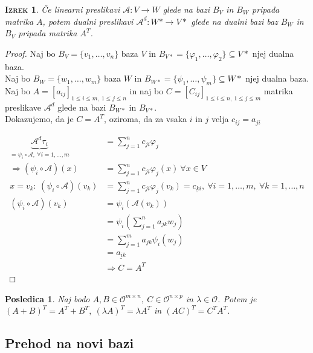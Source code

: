 \documentclass[a4paper,12pt]{article}
\newcommand{\A}{\mathcal{A}}
\newcommand{\OO}{\mathcal{O}}
\newtheorem*{izrek}{\textsc{Izrek}}
\newtheorem*{posl}{Posledica}
\begin{document}
\begin{izrek}
	Če linearni preslikavi $\A:V\to W$ glede na bazi $B_V$ in $B_W$ pripada matrika $A$, potem dualni preslikavi $\A^d:W*\to V*$ glede na dualni bazi baz $B_W$ in $B_V$ pripada matrika $A^T$. \\
\end{izrek}

\begin{proof}
	Naj bo $B_V=\{v_1,\ldots,v_n\}$ baza $V$ in $B_{V*}=\{\varphi_1,\ldots,\varphi_2\} \subseteq V*$ njej dualna baza.\\
	
	Naj bo $B_W=\{w_1,\ldots,w_m\}$ baza $W$ in $B_{W*}=\{\psi_1,\ldots,\psi_m\}\subseteq W*$ njej dualna baza. \\

	Naj bo $A=[a_{ij}]_{1\leq i \leq m,~1\leq j \leq n}$ in naj bo $C=[C_{ij}]_{1\leq i \leq n,~1\leq j \leq m}$ matrika preslikave $\A^d$ glede na bazi $B_{W*}$ in $B_{V*}$. \\

	Dokazujemo, da je $C=A^T$, oziroma, da za vsaka $i$ in $j$ velja $c_{ij}=a_{ji}$ 

	\begin{align*}
		\underbrace{\A^d\tau_i}_{=\psi_i\circ \A,~\forall i=1,\ldots,m}&=\sum_{j=1}^nc_{ji}\varphi_j \\
		\Rightarrow (\psi_i\circ \A)(x)&=\sum_{j=1}^n c_{ji}\varphi_j(x)~\forall x\in V \\
		x=v_k:~(\psi_i\circ \A)(v_k)&=\sum_{j=1}^nc_{ji}\varphi_j(v_k)=\underline{c_{ki}},~\forall i=1,\ldots,m,~\forall k=1,\ldots,n \\
		(\psi_i\circ \A)(v_k)&=\psi_i(\A(v_k)) \\
		&= \psi_i(\sum_{j=1}^na_{jk}w_j)\\
		&= \sum_{j=1}^ma_{jk} \psi_i (w_j)\\
		&= \underline{a_{ik}} \\
		&\Rightarrow C=A^T
	\end{align*}
\end{proof}

\begin{posl}
	Naj bodo $A,B \in \OO^{m\times n},~C\in \OO^{n\times p}$ in $\lambda \in \OO$. Potem je \linebreak  $(A+B)^T=A^T+B^T,~(\lambda A)^T=\lambda A^T$ in $(AC)^T=C^TA^T$. 
\end{posl}

\newpage 

\subsection{Prehod na novi bazi}
\end{document}
